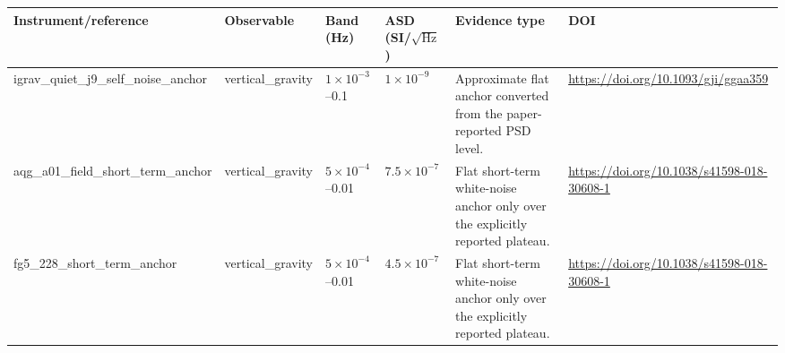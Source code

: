 \begin{tabular}{llllll}
\toprule
Instrument/reference & Observable & Band (Hz) & ASD (SI/$\sqrt{\mathrm{Hz}}$) & Evidence type & DOI \\
\midrule
igrav\_quiet\_j9\_self\_noise\_anchor & vertical\_gravity & $1\times10^{-3}$--0.1 & $1\times10^{-9}$ & Approximate flat anchor converted from the paper-reported PSD level. & \url{https://doi.org/10.1093/gji/ggaa359} \\
aqg\_a01\_field\_short\_term\_anchor & vertical\_gravity & $5\times10^{-4}$--0.01 & $7.5\times10^{-7}$ & Flat short-term white-noise anchor only over the explicitly reported plateau. & \url{https://doi.org/10.1038/s41598-018-30608-1} \\
fg5\_228\_short\_term\_anchor & vertical\_gravity & $5\times10^{-4}$--0.01 & $4.5\times10^{-7}$ & Flat short-term white-noise anchor only over the explicitly reported plateau. & \url{https://doi.org/10.1038/s41598-018-30608-1} \\
\bottomrule
\end{tabular}
